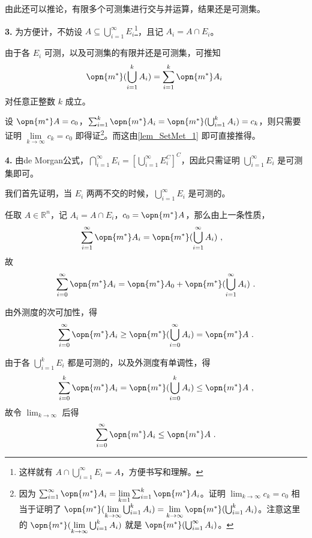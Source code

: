 由此还可以推论，有限多个可测集进行交与并运算，结果还是可测集。

\textbf{3.} 为方便计，不妨设 $A\subseteq \bigcup_{i=1}^\infty E_i$\footnote{这样就有 $A\cap \bigcup_{i=1}^{\infty}E_i=A$，方便书写和理解。}，且记 $A_i=A\cap E_i$。

由于各 $E_i$ 可测，以及可测集的有限并还是可测集，可推知
\begin{equation}
\opn{m^*}(\bigcup_{i=1}^k A_i)=\sum_{i=1}^k \opn{m^*}A_i~
\end{equation}
对任意正整数 $k$ 成立。

设 $\opn{m^*}A=c_0$，$\sum_{i=1}^k \opn{m^*}A_i=\opn{m^*}(\bigcup_{i=1}^k A_i)=c_k$，则只需要证明 $\lim\limits_{k\to \infty}c_k=c_0$ 即得证\footnote{因为 $\sum_{i=1}^\infty \opn{m^*}A_i=\lim\limits_{k=1}\sum_{i=1}^k\opn{m^*}A_i$。证明 $\lim_{k\to\infty}c_k=c_0$ 相当于证明了 $\opn{m^*}(\lim\limits_{k\to\infty}\bigcup^k_{i=1}A_i)=\lim\limits_{k\to\infty}\opn{m^*}(\bigcup^k_{i=1}A_i)$。注意这里的 $\opn{m^*}(\lim\limits_{k\to\infty}\bigcup^k_{i=1}A_i)$ 就是 $\opn{m^*}(\bigcup^\infty_{i=1}A_i)$。}。而这由\autoref{lem_SetMet_1} 即可直接推得。%

\textbf{4.} 由de Morgan公式，$\bigcap_{i=1}^\infty E_i=[\bigcup_{i=1}^\infty E_i^C]^C$，因此只需证明 $\bigcup_{i=1}^\infty E_i$ 是可测集即可。

我们首先证明，当 $E_i$ 两两不交的时候，$\bigcup^\infty_{i=1}E_i$ 是可测的。

任取 $A\in\mathbb{R}^n$，记 $A_i=A\cap E_i$，$c_0=\opn{m^*}A$，那么由上一条性质，
\begin{equation}
\begin{aligned}
\sum^\infty_{i=1}\opn{m^*}A_i&=\opn{m^*}(\bigcup_{i=1}^\infty A_i)~,
\end{aligned}
\end{equation}
故
\begin{equation}\label{eq_MsbSet_2}
\sum^\infty_{i=0}\opn{m^*}A_i=\opn{m^*}A_0+\opn{m^*}(\bigcup_{i=1}^\infty A_i)~.
\end{equation}


由外测度的次可加性，得
\begin{equation}\label{eq_MsbSet_3}
\sum_{i=0}^\infty\opn{m^*}A_i\geq \opn{m^*}(\bigcup_{i=0}^\infty A_i)=\opn{m^*}A~.
\end{equation}

由于各 $\bigcup_{i=1}^k E_i$ 都是可测的，以及外测度有单调性，得
\begin{equation}
\sum_{i=0}^k\opn{m^*}A_i=\opn{m^*}(\bigcup_{i=0}^k A_i)\leq \opn{m^*}A~,
\end{equation}
故令 $\lim_{k\to \infty}$ 后得
\begin{equation}\label{eq_MsbSet_5}
\sum_{i=0}^\infty\opn{m^*}A_i\leq \opn{m^*}A~.
\end{equation}


